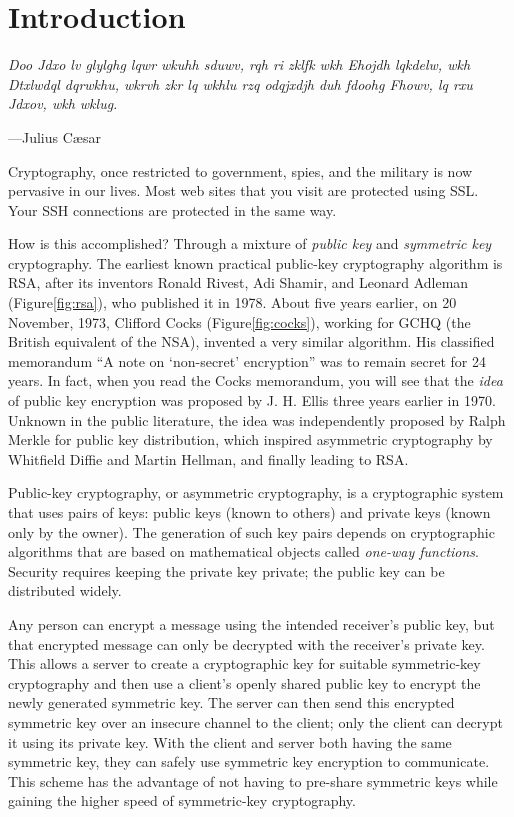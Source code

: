 \section{Introduction}

\textwidth
\epigraph{\emph{Doo Jdxo lv glylghg lqwr wkuhh sduwv, rqh ri zklfk wkh Ehojdh lqkdelw, wkh Dtxlwdql dqrwkhu, wkrvh zkr lq wkhlu rzq odqjxdjh duh fdoohg Fhowv, lq rxu Jdxov, wkh wklug.}}{---Julius C{\ae}sar}

\noindent
Cryptography, once restricted to government, spies, and the military is
now pervasive in our lives. Most web sites that you visit are protected
using SSL. Your SSH connections are protected in the same way.

How is this accomplished? Through a mixture of \emph{public key} and
\emph{symmetric key} cryptography. The earliest known practical
public-key cryptography algorithm is RSA, after its inventors Ronald
Rivest, Adi Shamir, and Leonard Adleman (Figure\xspace\ref{fig:rsa}),
who published it in 1978. About
five years earlier, on 20 November, 1973, Clifford Cocks (Figure\xspace\ref{fig:cocks}), working for
GCHQ (the British equivalent of the NSA), invented a very similar
algorithm. His classified memorandum ``A note on `non-secret'
encryption'' was to remain secret for 24 years. In fact, when you read
the Cocks memorandum, you will see that the \emph{idea} of public key
encryption was proposed by J.\xspace H.\xspace Ellis three years earlier
in 1970. Unknown in the public literature, the idea was independently
proposed by Ralph Merkle for public key distribution, which inspired
asymmetric cryptography by  Whitfield Diffie and Martin Hellman, and
finally leading to RSA.

Public-key cryptography, or asymmetric cryptography, is a cryptographic
system that uses pairs of keys: public keys (known to others) and
private keys (known only by the owner). The generation of such key pairs
depends on cryptographic algorithms that are based on mathematical
objects called \emph{one-way functions}. Security requires keeping the
private key private; the public key can be distributed widely.

Any person can encrypt a message using the intended receiver's public
key, but that encrypted message can only be decrypted with the
receiver's private key. This allows a server to create a cryptographic
key for suitable symmetric-key cryptography and then use a client's
openly shared public key to encrypt the newly generated symmetric key.
The server can then send this encrypted symmetric key over an insecure
channel to the client; only the client can decrypt it using its private
key. With the client and server both having the same symmetric key, they
can safely use symmetric key encryption to communicate. This scheme has
the advantage of not having to pre-share symmetric keys while gaining the
higher speed of symmetric-key cryptography.

